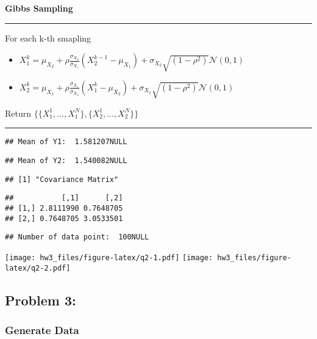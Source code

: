 \documentclass[
]{article}
\begin{document}
\textbf{Gibbs Sampling}

\begin{center}\rule{0.5\linewidth}{0.5pt}\end{center}

For each k-th smapling

\begin{itemize}
\item
  \(X_{1}^{k} = \mu_{X_2}+\rho \frac{\sigma_{X_2}}{\sigma_{X_1}}(X_2^{k-1}-\mu_{X_1}) + \sigma_{X_2} \sqrt{(1-\rho^2)} \mathcal{N}(0, 1)\)
\item
  \(X_2^{k} = \mu_{X_1}+\rho \frac{\sigma_{X_1}}{\sigma_{X_2}}(X_1^{k}-\mu_{X_2}) + \sigma_{X_1} \sqrt{(1-\rho^2)} \mathcal{N}(0, 1)\)
\end{itemize}

Return \(\{ \{ X_1^1, ..., X_1^N \}, \{ X_2^1, ..., X_2^N \} \}\)

\begin{center}\rule{0.5\linewidth}{0.5pt}\end{center}

\begin{verbatim}
## Mean of Y1:  1.581207NULL
\end{verbatim}

\begin{verbatim}
## Mean of Y2:  1.540082NULL
\end{verbatim}

\begin{verbatim}
## [1] "Covariance Matrix"
\end{verbatim}

\begin{verbatim}
##           [,1]      [,2]
## [1,] 2.8111990 0.7648705
## [2,] 0.7648705 3.0533501
\end{verbatim}

\begin{verbatim}
## Number of data point:  100NULL
\end{verbatim}

\texttt{[image: hw3\_files/figure-latex/q2-1.pdf]}
\texttt{[image: hw3\_files/figure-latex/q2-2.pdf]}

\hypertarget{problem-3}{%
\subsection{Problem 3:}\label{problem-3}}

\hypertarget{generate-data}{%
\subsubsection{Generate Data}\label{generate-data}}
\end{document}

